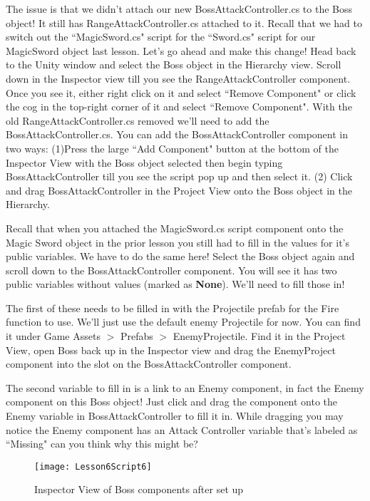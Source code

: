 \documentclass{article}
\begin{document}
The issue is that we didn't attach our new BossAttackController.cs to the Boss object! It still has RangeAttackController.cs attached to it. Recall that we had to switch out the ``MagicSword.cs" script for the ``Sword.cs" script for our MagicSword object last lesson. Let's go ahead and make this change! Head back to the Unity window and select the Boss object in the Hierarchy view. Scroll down in the Inspector view till you see the RangeAttackController component. Once you see it, either right click on it and select ``Remove Component" or click the cog in the top-right corner of it and select ``Remove Component". With the old RangeAttackController.cs removed we'll need to add the BossAttackController.cs. You can add the BossAttackController component in two ways: (1)Press the large ``Add Component" button at the bottom of the Inspector View with the Boss object selected then begin typing BossAttackController till you see the script pop up and then select it. (2) Click and drag BossAttackController in the Project View onto the Boss object in the Hierarchy. 

Recall that when you attached the MagicSword.cs script component onto the Magic Sword object in the prior lesson you still had to fill in the values for it's public variables. We have to do the same here! Select the Boss object again and scroll down to the BossAttackController component. You will see it has two public variables without values (marked as \textbf{None}). We'll need to fill those in! 

The first of these needs to be filled in with the Projectile prefab for the Fire function to use. We'll just use the default enemy Projectile for now. You can find it under Game Assets $>$ Prefabs $>$ EnemyProjectile. Find it in the Project View, open Boss back up in the Inspector view and drag the EnemyProject component into the slot on the BossAttackController component. 

The second variable to fill in is a link to an Enemy component, in fact the Enemy component on this Boss object! Just click and drag the component onto the Enemy variable in BossAttackController to fill it in. While dragging you may notice the Enemy component has an Attack Controller variable that's labeled as ``Missing" can you think why this might be? 

 \begin{figure}
  \texttt{[image: Lesson6Script6]}
  \caption{Inspector View of Boss components after set up}
  \label{fig:Lesson6Script6}
\end{figure}
\end{document}
